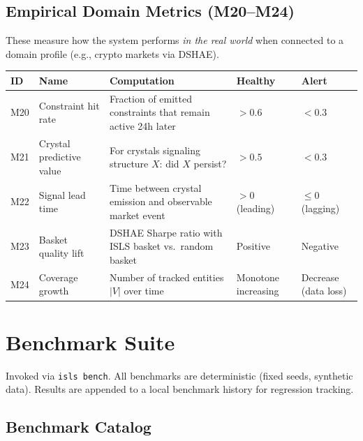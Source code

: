 \documentclass[10pt,a4paper]{article}
\begin{document}
\subsection{Empirical Domain Metrics (M20--M24)}

These measure how the system performs \emph{in the real world} when connected to a domain profile (e.g., crypto markets via DSHAE).

\begin{longtable}{l l p{4.8cm} l l}
\toprule \textbf{ID} & \textbf{Name} & \textbf{Computation} & \textbf{Healthy} & \textbf{Alert} \\
\midrule\endhead
M20 & Constraint hit rate & Fraction of emitted constraints that remain active 24h later & $>0.6$ & $<0.3$ \\
M21 & Crystal predictive value & For crystals signaling structure $X$: did $X$ persist? & $>0.5$ & $<0.3$ \\
M22 & Signal lead time & Time between crystal emission and observable market event & $>0$ (leading) & $\leq 0$ (lagging) \\
M23 & Basket quality lift & DSHAE Sharpe ratio with ISLS basket vs.\ random basket & Positive & Negative \\
M24 & Coverage growth & Number of tracked entities $|V|$ over time & Monotone increasing & Decrease (data loss) \\
\bottomrule
\end{longtable}

\section{Benchmark Suite}
\label{sec:bench}

Invoked via \texttt{isls bench}. All benchmarks are deterministic (fixed seeds, synthetic data). Results are appended to a local benchmark history for regression tracking.

\subsection{Benchmark Catalog}
\end{document}
